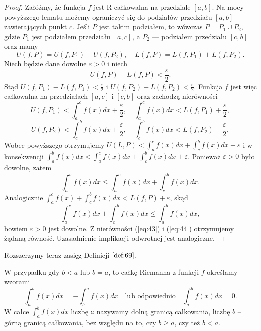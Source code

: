 \documentclass[leqno]{article}
\begin{document}
\begin{justify}
\begin{proof}
    Załóżmy, że funkcja $f$ jest R-całkowalna na przedziale $[a,b]$. Na mocy powyższego lematu
    możemy ograniczyć się do podziałów przedziału $[a,b]$ zawierających punkt $c$. 
    Jeśli $P$ jest takim podziałem, to wówczas $P = P_1 \cup P_2$, gdzie $P_1$ jest podziałem
    przedziału $[a,c]$, a $P_2$ --- podziałem przedziału $[c,b]$ oraz mamy
    \[
        U(f, P) = U(f, P_1) + U(f, P_2), \quad L(f, P) = L(f, P_1) + L(f, P_2).
    \]
    Niech będzie dane dowolne $\varepsilon > 0$ i niech
    \[
        U(f, P) - L(f, P) < \frac{\varepsilon}{2}.
    \]
    Stąd $U(f, P_1) - L(f, P_1) < \frac{\varepsilon}{2}$ i $U(f, P_2) - L(f, P_2) < \frac{\varepsilon}{2}$. 
    Funkcja $f$ jest więc całkowalna na przedziałach $[a,c]$ i $[c, b]$ oraz zachodzą nierówności
    \[
        U(f, P_1) < \int_{a}^{c}f(x)dx + \frac{\varepsilon}{2}, \quad \int_{a}^{c}f(x)dx < L(f, P_1) + \frac{\varepsilon}{2},
    \]
    \[
        U(f, P_2) < \int_{c}^{b}f(x)dx + \frac{\varepsilon}{2}, \quad \int_{c}^{b}f(x)dx < L(f, P_2) + \frac{\varepsilon}{2},
    \]
    Wobec powyższego otrzymujemy $U(L, P) < \int_{a}^{c}f(x)dx + \int_{c}^{b}f(x)dx + \varepsilon$
    i w konsekwencji $\int_{a}^{b}f(x)dx < \int_{a}^{c}f(x)dx + \int_{c}^{b}f(x)dx + \varepsilon$.
    Ponieważ $\varepsilon > 0$ było dowolne, zatem
    \begin{equation}\label{eq:43}
        \int_{a}^{b}f(x)dx \leqslant \int_{a}^{c}f(x)dx + \int_{c}^{b}f(x)dx.
    \end{equation}
    Analogicznie $\int_{a}^{c}f(x) + \int_{c}^{b}f(x)dx < L(f, P) + \varepsilon$, skąd
    \begin{equation}\label{eq:44}
        \int_{a}^{c}f(x)dx + \int_{c}^{b}f(x)dx \leqslant \int_{a}^{b}f(x)dx,
    \end{equation}
    bowiem $\varepsilon > 0$ jest dowolne. Z nierówności (\ref{eq:43}) i (\ref{eq:44}) otrzymujemy żądaną równość.
    Uzasadnienie implikacji odwrotnej jest analogiczne.
\end{proof}

Rozszerzymy teraz zasięg Definicji $\ref{def:69}$.

\begin{defn}
    W przypadku gdy $b < a$ lub $b = a$, to całkę Riemanna z funkcji $f$ określamy wzorami
    \[
        \int_{a}^{b}f(x)dx = -\int_{b}^{a}f(x)dx \quad \text{lub odpowiednio} \quad \int_{a}^{b}f(x)dx = 0.
    \]
    W całce $\int_{a}^{b}f(x)dx$ liczbę $a$ nazywamy dolną granicą całkowania, liczbę $b$ -- górną granicą całkowania,
    bez względu na to, czy $b \geqslant a$, czy też $b < a$. 
\end{defn}


\end{justify}
\end{document}
